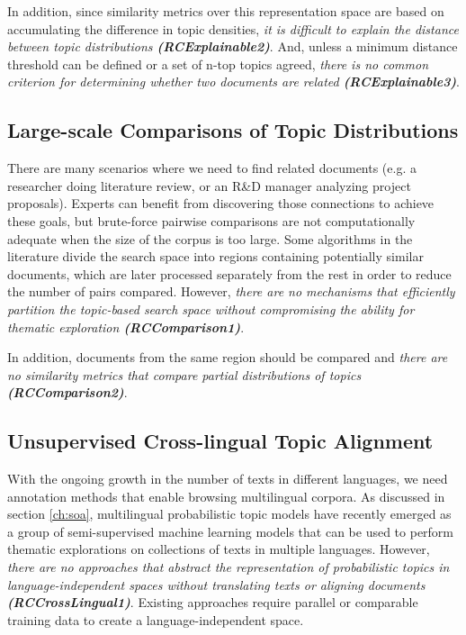 In addition, since similarity metrics over this representation space are based on accumulating the difference in topic densities, \textit{it is difficult to explain the distance between topic distributions \textbf{(RCExplainable2)}}. And, unless a minimum distance threshold can be defined or a set of n-top topics agreed, \textit{there is no common criterion for determining whether two documents are related \textbf{(RCExplainable3)}}.  


\subsection{Large-scale Comparisons of Topic Distributions}

There are many scenarios where we need to find related documents (e.g. a researcher doing literature review, or an R\&D  manager analyzing project proposals). Experts can benefit from discovering those connections to achieve these goals, but brute-force pairwise comparisons are not computationally adequate when the size of the corpus is too large. Some algorithms in the literature divide the search space into regions containing potentially similar documents, which are later processed separately from the rest in order to reduce the number of pairs compared. However, \textit{there are no mechanisms that efficiently partition the topic-based search space without compromising the ability for thematic exploration \textbf{(RCComparison1)}}.

In addition, documents from the same region should be compared and \textit{there are no similarity metrics that compare partial distributions of topics \textbf{(RCComparison2)}}.


\subsection{Unsupervised Cross-lingual Topic Alignment}

With the ongoing growth in the number of texts in different languages, we need annotation methods that enable browsing multilingual corpora. As discussed in section \ref{ch:soa}, multilingual probabilistic topic models have recently emerged as a group of semi-supervised machine learning models that can be used to perform thematic explorations on collections of texts in multiple languages. However, \textit{there are no approaches that abstract the representation of probabilistic topics in language-independent spaces without translating texts or aligning documents \textbf{(RCCrossLingual1)}}. Existing approaches require parallel or comparable training data to create a language-independent space. 

